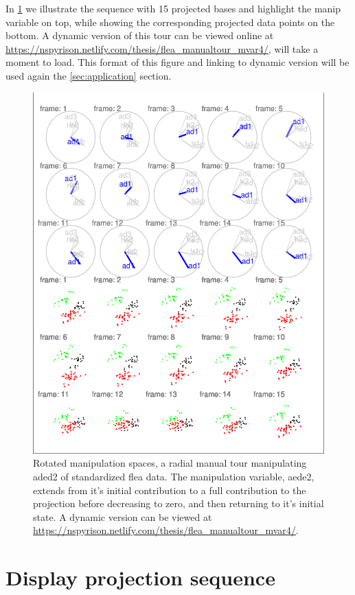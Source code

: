\documentclass{monashthesis}
\begin{document}
In \ref{fig:step3} we illustrate the sequence with 15 projected bases
and highlight the manip variable on top, while showing the corresponding
projected data points on the bottom. A dynamic version of this tour can
be viewed online at
\url{https://nspyrison.netlify.com/thesis/flea_manualtour_mvar4/}, will
take a moment to load. This format of this figure and linking to dynamic
version will be used again the \ref{sec:application} section.

\begin{figure}
\centering
\includegraphics{thesis_files/figure-latex/step3-1.pdf}
\caption{\label{fig:step3}Rotated manipulation spaces, a radial manual tour
manipulating aded2 of standardized flea data. The manipulation variable,
aede2, extends from it's initial contribution to a full contribution to
the projection before decreasing to zero, and then returning to it's
initial state. A dynamic version can be viewed at
\url{https://nspyrison.netlify.com/thesis/flea_manualtour_mvar4/}.}
\end{figure}

\section{Display projection sequence}\label{display-projection-sequence}
\end{document}
